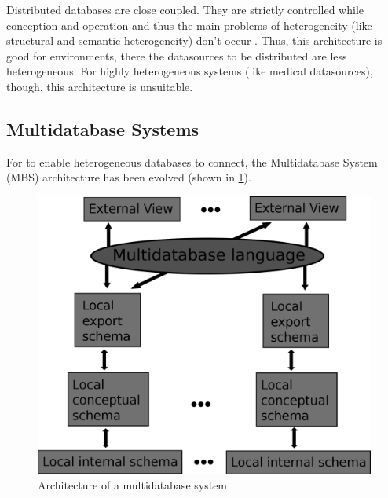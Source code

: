 Distributed databases are close coupled. They are strictly controlled while conception and operation and thus the main problems of heterogeneity (like structural and semantic heterogeneity) don't occur \cite[p. 93]{DBLP:books/dp/LeserN2006}. 
Thus, this architecture is good for environments, there the datasources to be distributed are less heterogeneous. For highly heterogeneous systems (like medical datasources), though, this architecture is unsuitable.
 

\subsection{Multidatabase Systems}

For to enable heterogeneous databases to connect, the Multidatabase System (MBS) architecture has been evolved (shown in \ref{MBSDatabaseArchitecture}). 

\begin{figure}[H]
	\begin{center}
		\includegraphics[scale=0.5]{figures/MultidatabaseArchitecture.png}
	\end{center}
	\caption{Architecture of a  multidatabase system \cite[p. 94]{DBLP:books/dp/LeserN2006}}
	\label{MBSDatabaseArchitecture}
\end{figure}

